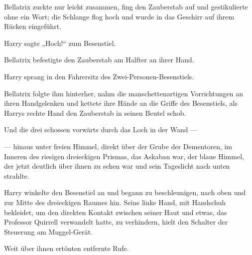 Bellatrix zuckte nur leicht zusammen, fing den Zauberstab auf und gestikulierte ohne ein Wort; die Schlange flog hoch und wurde in das Geschirr auf ihrem Rücken eingeführt.

Harry sagte
„Hoch!“ zum Besenstiel.

Bellatrix befestigte den Zauberstab am Halfter an ihrer Hand.

Harry sprang in den Fahrersitz des Zwei-Personen-Besenstiels.

Bellatrix folgte ihm hinterher, nahm die manschettenartigen Vorrichtungen an ihren Handgelenken und kettete ihre Hände an die Griffe des Besenstiels, als Harrys rechte Hand den Zauberstab in seinen Beutel schob.

Und die drei schossen vorwärts durch das Loch in der Wand —

— hinaus unter freien Himmel, direkt über der Grube der Dementoren, im Inneren des riesigen dreieckigen Prismas, das Askaban war, der blaue Himmel, der jetzt deutlich über ihnen zu sehen war und sein Tageslicht nach unten strahlte.

Harry winkelte den Besenstiel an und begann zu beschleunigen, nach oben und zur Mitte des dreieckigen Raumes hin. Seine linke Hand, mit Handschuh bekleidet, um den direkten Kontakt zwischen seiner Haut und etwas, das Professor Quirrell verwandelt hatte, zu verhindern, hielt den Schalter der Steuerung am Muggel-Gerät.

Weit über ihnen ertönten entfernte Rufe.

